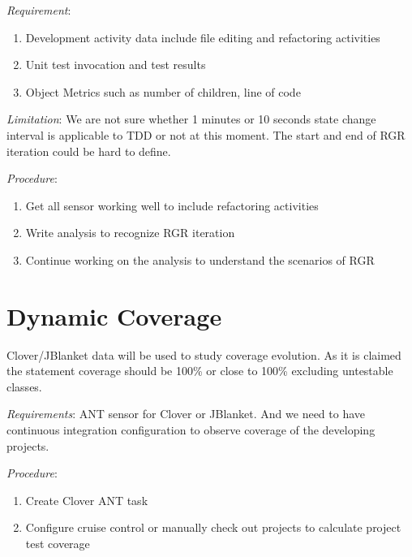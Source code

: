 \begin{description}
\item \emph{Requirement}: 
\begin{enumerate}
\item Development activity data include file editing and refactoring activities
\item Unit test invocation and test results
\item Object Metrics such as number of children, line of code
\end{enumerate}
\end{description}
\emph{Limitation}:
We are not sure whether 1 minutes or 10 seconds state change interval is
applicable to TDD or not at this moment. The start and end of RGR iteration
could be hard to define.

\begin{description}
\item\emph{Procedure}:
\begin{enumerate}
\item Get all sensor working well to include refactoring activities
\item Write analysis to recognize RGR iteration
\item Continue working on the analysis to understand the scenarios of RGR
\end{enumerate}
\end{description}

\section{Dynamic Coverage}
Clover/JBlanket data will be used to study coverage evolution. As it is
claimed the statement coverage should be 100\% or close to 100\% excluding
untestable classes. 

\begin{description}
\item\emph{Requirements}:
   ANT sensor for Clover or JBlanket. And we need to have continuous
   integration configuration to observe coverage of the developing projects.
\end{description}

\begin{description}
\item\emph{Procedure}:
\begin{enumerate}
\item Create Clover ANT task
\item Configure cruise control or manually check out projects to calculate
project test coverage
\end{enumerate}
\end{description}

